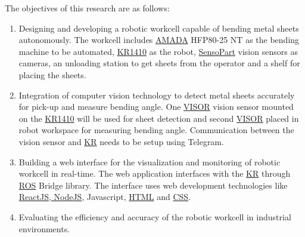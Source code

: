 The objectives of this research are as follows:
\begin{enumerate}
    \item Designing and developing a robotic workcell capable of bending metal sheets autonomously. The workcell includes \hyperref[acro:AMADA]{AMADA} HFP80-25 NT as the bending machine to be automated, \hyperref[acro:KR]{KR1410} as the robot, \hyperref[acro:SensoPart]{SensoPart} vision sensors as cameras, an unloading station to get sheets from the operator and a shelf for placing the sheets.
    \item Integration of computer vision technology to detect metal sheets accurately for pick-up and measure bending angle. One \hyperref[acro:VISOR]{VISOR\textsuperscript{\textregistered}} vision sensor mounted on the \hyperref[acro:KR]{KR1410} will be used for sheet detection and second \hyperref[acro:VISOR]{VISOR\textsuperscript{\textregistered}} placed in robot workspace for measuring bending angle. Communication between the vision sensor and \hyperref[acro:KR]{KR} needs to be setup using Telegram.
    \item Building a web interface for the visualization and monitoring of robotic workcell in real-time. The web application interfaces with the \hyperref[acro:KR]{KR} through \hyperref[acro:ROS]{ROS} Bridge library. The interface uses web development technologies like \hyperref[acro:JS]{ReactJS, NodeJS}, Javascript, \hyperref[acro:HTML5]{HTML} and \hyperref[acro:CSS]{CSS}.
    \item Evaluating the efficiency and accuracy of the robotic workcell in industrial environments.
\end{enumerate}